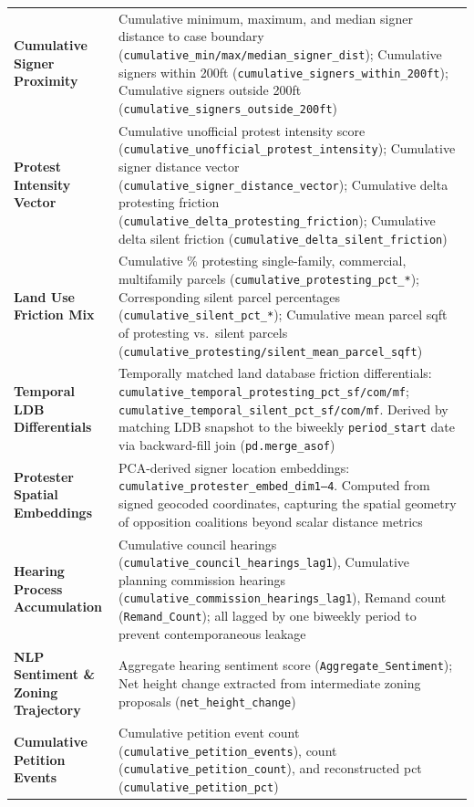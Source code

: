 \begin{table}[htbp]
\begin{tabular}{@{}p{} p{}@{}}
        \textbf{Cumulative Signer Proximity} & Cumulative minimum, maximum, and median signer distance to case boundary (\texttt{cumulative\_min/max/median\_signer\_dist}); Cumulative signers within 200ft (\texttt{cumulative\_signers\_within\_200ft}); Cumulative signers outside 200ft (\texttt{cumulative\_signers\_outside\_200ft}) \\
        \textbf{Protest Intensity Vector}  & Cumulative unofficial protest intensity score (\texttt{cumulative\_unofficial\_protest\_intensity}); Cumulative signer distance vector (\texttt{cumulative\_signer\_distance\_vector}); Cumulative delta protesting friction (\texttt{cumulative\_delta\_protesting\_friction}); Cumulative delta silent friction (\texttt{cumulative\_delta\_silent\_friction}) \\
        \textbf{Land Use Friction Mix}     & Cumulative \% protesting single-family, commercial, multifamily parcels (\texttt{cumulative\_protesting\_pct\_*}); Corresponding silent parcel percentages (\texttt{cumulative\_silent\_pct\_*}); Cumulative mean parcel sqft of protesting vs.\ silent parcels (\texttt{cumulative\_protesting/silent\_mean\_parcel\_sqft}) \\
        \textbf{Temporal LDB Differentials} & Temporally matched land database friction differentials: \texttt{cumulative\_temporal\_protesting\_pct\_sf/com/mf}; \texttt{cumulative\_temporal\_silent\_pct\_sf/com/mf}. Derived by matching LDB snapshot to the biweekly \texttt{period\_start} date via backward-fill join (\texttt{pd.merge\_asof}) \\
        \textbf{Protester Spatial Embeddings} & PCA-derived signer location embeddings: \texttt{cumulative\_protester\_embed\_dim1--4}. Computed from signed geocoded coordinates, capturing the spatial geometry of opposition coalitions beyond scalar distance metrics \\
        \textbf{Hearing Process Accumulation} & Cumulative council hearings (\texttt{cumulative\_council\_hearings\_lag1}), Cumulative planning commission hearings (\texttt{cumulative\_commission\_hearings\_lag1}), Remand count (\texttt{Remand\_Count}); all lagged by one biweekly period to prevent contemporaneous leakage \\
        \textbf{NLP Sentiment \& Zoning Trajectory} & Aggregate hearing sentiment score (\texttt{Aggregate\_Sentiment}); Net height change extracted from intermediate zoning proposals (\texttt{net\_height\_change}) \\
        \textbf{Cumulative Petition Events} & Cumulative petition event count (\texttt{cumulative\_petition\_events}), count (\texttt{cumulative\_petition\_count}), and reconstructed pct (\texttt{cumulative\_petition\_pct}) \\

\end{tabular}
\end{table}
